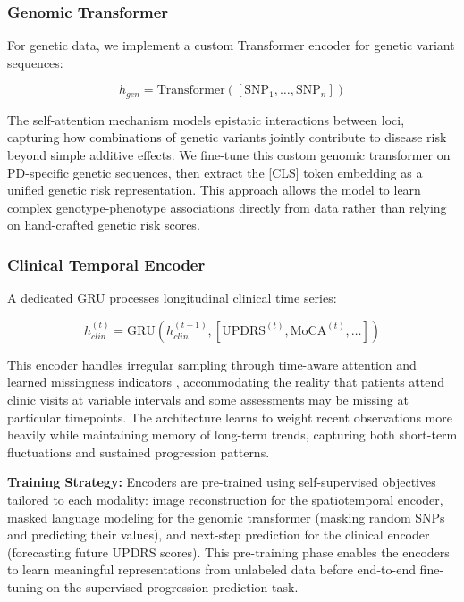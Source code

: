 \documentclass[conference]{IEEEtran}
\begin{document}
\subsubsection{Genomic Transformer}
For genetic data, we implement a custom Transformer encoder for genetic variant sequences:

\begin{equation}
h_{gen} = \text{Transformer}([\text{SNP}_1, \ldots, \text{SNP}_n])
\end{equation}

The self-attention mechanism models epistatic interactions between loci, capturing how combinations of genetic variants jointly contribute to disease risk beyond simple additive effects. We fine-tune this custom genomic transformer on PD-specific genetic sequences, then extract the [CLS] token embedding as a unified genetic risk representation. This approach allows the model to learn complex genotype-phenotype associations directly from data rather than relying on hand-crafted genetic risk scores.

\subsubsection{Clinical Temporal Encoder}
A dedicated GRU processes longitudinal clinical time series:

\begin{equation}
h_{clin}^{(t)} = \text{GRU}(h_{clin}^{(t-1)}, [\text{UPDRS}^{(t)}, \text{MoCA}^{(t)}, \ldots])
\end{equation}

This encoder handles irregular sampling through time-aware attention and learned missingness indicators \cite{che2018recurrent}, accommodating the reality that patients attend clinic visits at variable intervals and some assessments may be missing at particular timepoints. The architecture learns to weight recent observations more heavily while maintaining memory of long-term trends, capturing both short-term fluctuations and sustained progression patterns.

\textbf{Training Strategy:} Encoders are pre-trained using self-supervised objectives tailored to each modality: image reconstruction for the spatiotemporal encoder, masked language modeling for the genomic transformer (masking random SNPs and predicting their values), and next-step prediction for the clinical encoder (forecasting future UPDRS scores). This pre-training phase enables the encoders to learn meaningful representations from unlabeled data before end-to-end fine-tuning on the supervised progression prediction task.
\end{document}

